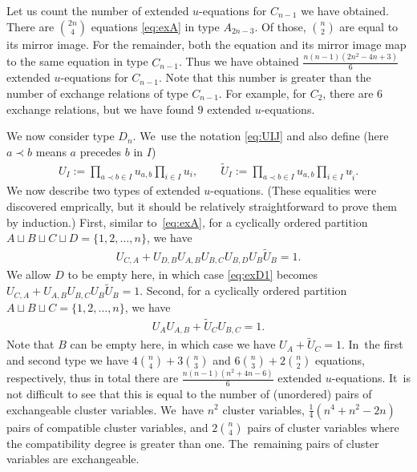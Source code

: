 \documentclass[10pt,a4paper]{amsart}
\numberwithin{equation}{section}
\begin{document}
Let us count the number of extended $u$-equations for $C_{n-1}$ we have obtained. There are $\binom{2n}{4}$ equations \eqref{eq:exA} in type $A_{2n-3}$. Of those, $\binom{n}{2}$ are equal to its mirror image. For the remainder, both the equation and its mirror image map to the same equation in type $C_{n-1}$. Thus we have obtained $\frac{n(n{-}1)(2n^2-4n+3)}{6}$ extended $u$-equations for $C_{n-1}$. Note that this number is greater than the number of exchange relations of type $C_{n-1}$. For example, for $C_2$, there are $6$ exchange relations, but we have found $9$ extended $u$-equations.

\medskip{} %
We now consider type $D_n$. We~use the notation \eqref{eq:UIJ} and also define (here $a\prec b$ means $a$ precedes $b$ in $I$)
\begin{gather*}
U_I:=\prod_{a\prec b \in I} u_{a,b} \prod_{i \in I} u_i,\qquad
\tilde{U}_I:=\prod_{a\prec b \in I} u_{a,b} \prod_{i \in I} u_{\tilde i}.
\end{gather*}
We now describe two types of extended $u$-equations. (These equalities were discovered emprically, but it should be relatively straightforward to prove them by induction.) First, similar to~\eqref{eq:exA}, for a cyclically ordered partition $A\sqcup B\sqcup C\sqcup D=\{1,2,\dots, n\}$, we have
\begin{gather}\label{eq:exD1}
U_{C,A}+U_{D,B} U_{A,B} U_{B,C} U_{B,D} U_B \tilde{U}_B=1.
\end{gather}
We allow $D$ to be empty here, in which case \eqref{eq:exD1} becomes $U_{C,A}+U_{A,B} U_{B,C} U_B \tilde{U}_B=1$. Second, for a cyclically ordered partition $A\sqcup B\sqcup C=\{1,2,\dots, n\}$, we have
\begin{gather}\label{eq:exD2}
U_A U_{A,B}+\tilde{U}_C U_{B,C}=1.
\end{gather}
Note that $B$ can be empty here, in which case we have $U_A+\tilde{U}_C=1$. In~the first and second type we have $4 {n \choose 4}+3 {n \choose 3}$ and $6 {n \choose 3}+2 {n \choose 2}$ equations, respectively, thus in total there are $\frac{n(n{-}1)(n^2+4n-6)}6$ extended $u$-equations. It~is not difficult to see that this is equal to the number of (unordered) pairs of exchangeable cluster variables. We~have $n^2$ cluster variables, $\frac{1}{4}(n^4+n^2-2n)$ pairs of compatible cluster variables, and $2\binom{n}{4}$ pairs of cluster variables where the compatibility degree is greater than one. The~remaining pairs of cluster variables are exchangeable.
\end{document}
